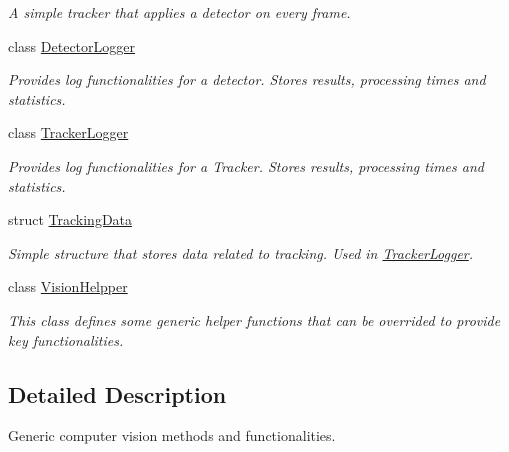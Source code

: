 \begin{DoxyCompactItemize}
\begin{DoxyCompactList}\small\item\em A simple tracker that applies a detector on every frame. \end{DoxyCompactList}\item 
class \hyperlink{class_vision_core_1_1_abstractions_1_1_detector_logger}{Detector\+Logger}
\begin{DoxyCompactList}\small\item\em Provides log functionalities for a detector. Stores results, processing times and statistics. \end{DoxyCompactList}\item 
class \hyperlink{class_vision_core_1_1_abstractions_1_1_tracker_logger}{Tracker\+Logger}
\begin{DoxyCompactList}\small\item\em Provides log functionalities for a Tracker. Stores results, processing times and statistics. \end{DoxyCompactList}\item 
struct \hyperlink{struct_vision_core_1_1_abstractions_1_1_tracking_data}{Tracking\+Data}
\begin{DoxyCompactList}\small\item\em Simple structure that stores data related to tracking. Used in \hyperlink{class_vision_core_1_1_abstractions_1_1_tracker_logger}{Tracker\+Logger}. \end{DoxyCompactList}\item 
class \hyperlink{class_vision_core_1_1_abstractions_1_1_vision_helpper}{Vision\+Helpper}
\begin{DoxyCompactList}\small\item\em This class defines some generic helper functions that can be overrided to provide key functionalities. \end{DoxyCompactList}\end{DoxyCompactItemize}


\subsection{Detailed Description}
Generic computer vision methods and functionalities. 